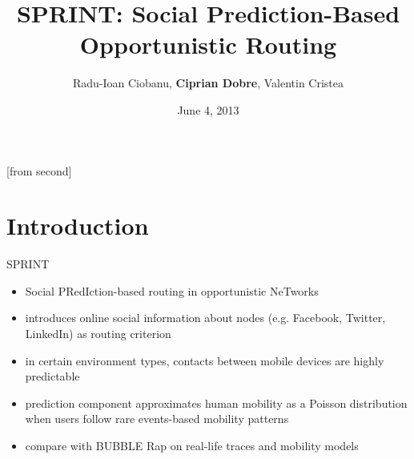\documentclass{beamer}
\title[SPRINT: Social Prediction-Based Opportunistic Routing]{SPRINT: Social Prediction-Based Opportunistic Routing}
\institute{Automatic Control and Computers Faculty,\\
	University Politehnica of Bucharest}
\author[R.I. Ciobanu, C. Dobre, V. Cristea]{Radu-Ioan Ciobanu, \textbf{Ciprian Dobre}, Valentin Cristea}
\date{June 4, 2013}
\begin{document}
[from second]


\frame{\titlepage}

\frame{\tableofcontents}

\section{Introduction}

\begin{frame}{SPRINT}
	\begin{itemize}
		\item Social PRedIction-based routing in opportunistic NeTworks
		\item introduces online social information about nodes (e.g. Facebook, Twitter, LinkedIn) as routing criterion
		\item in certain environment types, contacts between mobile devices are highly predictable
		\item prediction component approximates human mobility as a Poisson distribution when users follow rare events-based mobility patterns
		\item compare with BUBBLE Rap on real-life traces and mobility models
	\end{itemize}
\end{frame}
\end{document}
